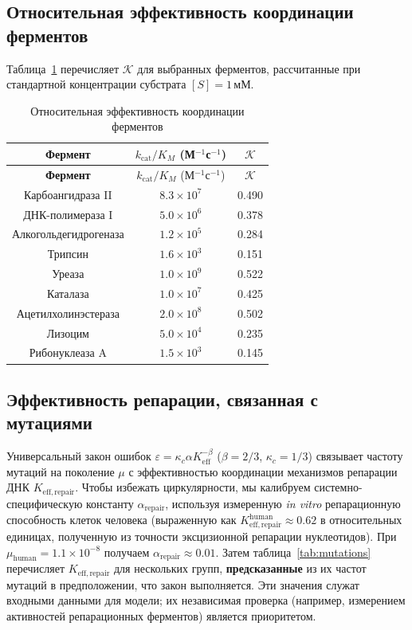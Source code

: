 \documentclass[12pt,a4paper]{article}
\newcommand{\REL}{\mathcal{K}}          %
\begin{document}
	\subsection{Относительная эффективность координации ферментов}
	\label{sec:enzymes}
	Таблица~\ref{tab:enzymes} перечисляет \(\REL\) для выбранных ферментов, рассчитанные при стандартной концентрации субстрата \([S]=1\,\text{мМ}\).
	
	\begin{longtable}{|c|c|c|}
		\caption{Относительная эффективность координации ферментов}\label{tab:enzymes}\\
		\hline
		\textbf{Фермент} & \(k_{\mathrm{cat}}/K_M\) (М\(^{-1}\)с\(^{-1}\)) & \(\REL\) \\
		\hline
		\endfirsthead
		\hline
		\textbf{Фермент} & \(k_{\mathrm{cat}}/K_M\) (М\(^{-1}\)с\(^{-1}\)) & \(\REL\) \\
		\hline
		\endhead
		\hline
		Карбоангидраза II & \(8.3\times10^7\) & 0.490 \\
		ДНК-полимераза I & \(5.0\times10^6\) & 0.378 \\
		Алкогольдегидрогеназа & \(1.2\times10^5\) & 0.284 \\
		Трипсин & \(1.6\times10^3\) & 0.151 \\
		Уреаза & \(1.0\times10^9\) & 0.522 \\
		Каталаза & \(1.0\times10^7\) & 0.425 \\
		Ацетилхолинэстераза & \(2.0\times10^8\) & 0.502 \\
		Лизоцим & \(5.0\times10^4\) & 0.235 \\
		Рибонуклеаза A & \(1.5\times10^3\) & 0.145 \\
		\hline
	\end{longtable}
	
	\subsection{Эффективность репарации, связанная с мутациями}
	\label{sec:mutations}
	Универсальный закон ошибок \(\varepsilon = \kappa_c \alpha K_{\mathrm{eff}}^{-\beta}\) (\(\beta=2/3\), \(\kappa_c=1/3\)) связывает частоту мутаций на поколение \(\mu\) с эффективностью координации механизмов репарации ДНК \(K_{\mathrm{eff,repair}}\). Чтобы избежать циркулярности, мы калибруем системно-специфическую константу \(\alpha_{\mathrm{repair}}\), используя измеренную \textit{in vitro} репарационную способность клеток человека (выраженную как \(K_{\mathrm{eff,repair}}^{\mathrm{human}} \approx 0.62\) в относительных единицах, полученную из точности эксцизионной репарации нуклеотидов). При \(\mu_{\mathrm{human}}=1.1\times10^{-8}\) получаем \(\alpha_{\mathrm{repair}} \approx 0.01\). Затем таблица~\ref{tab:mutations} перечисляет \(K_{\mathrm{eff,repair}}\) для нескольких групп, \textbf{предсказанные} из их частот мутаций в предположении, что закон выполняется. Эти значения служат входными данными для модели; их независимая проверка (например, измерением активностей репарационных ферментов) является приоритетом.
	
\end{document}
